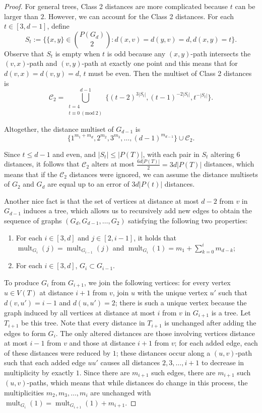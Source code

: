 \documentclass[12]{article}
\newcommand{\Mod}[1]{\ (\mathrm{mod}\ #1)}
\DeclareMathOperator{\mult}{mult}
\theoremstyle{definition}
\begin{document}
\begin{proof}
		  For general trees, Class 2 distances are more complicated because $t$ can be larger than $2$.  However, we can account for the Class 2 distances.  For each $t \in [3,d-1]$, define 
		  $$S_t := \{\{x,y\}\in {P(G_d) \choose 2}: d(x,v) = d(y,v) = d, d(x,y) = t\}.$$
		  Observe that $S_t$ is empty when $t$ is odd because any $(x,y)$-path intersects the $(v,x)$-path and $(v,y)$-path at exactly one point and this means that for $d(v,x) = d(v,y) = d$, $t$ must be even.  Then the multiset of Class 2 distances is 
		  $$\mathcal{C}_2 = \bigcup_{\substack{t = 4 \\ t \equiv 0 \Mod{2}}}^{d-1} \{(t-2)^{3|S_t|}, (t-1)^{-2|S_t|}, t^{-|S_t|}\}.$$
		
		Altogether, the distance multiset of $G_{d-1}$ is
		$$\{1^{m_1 + m_d}, 2^{m_2}, 3^{m_3}, \ldots, (d-1)^{m_{d-1}}\} \cup \mathcal{C}_2.$$
		
		Since $t \leq d-1$ and even, and $|S_t| \leq |P(T)|$, with each pair in $S_t$ altering $6$ distances, it follows that $\mathcal{C}_2$ alters at most $\frac{6d|P(T)|}{2} = 3d|P(T)|$ distances, which means that if the $\mathcal{C}_2$ distances were ignored, we can assume the distance multisets of $G_2$ and $G_d$ are equal up to an error of $3d|P(t)|$ distances.
		
		Another nice fact is that the set of vertices at distance at most $d-2$ from $v$ in $G_{d-1}$ induces a tree, which allows us to recursively add new edges to obtain the sequence of graphs $(G_d, G_{d-1}, \ldots, G_{2})$ satisfying the following two properties:
		\begin{enumerate}
			\item For each $i \in [3,d]$ and $j \in [2,i-1]$, it holds that $\mult_{G_i}(j) = \mult_{G_{i-1}}(j)$ and $\mult_{G_i}(1) = m_1 + \sum_{k=0}^{i} m_{d-k}$;
			\item For each $i \in [3,d]$, $G_{i} \subset G_{i-1}$.
		\end{enumerate}
		To produce $G_{i}$ from $G_{i+1}$, we join the following vertices:  for every vertex $u \in V(T)$ at distance $i+1$ from $v$, join $u$ with the unique vertex $u'$ such that $d(v,u') = i-1$ and $d(u,u') = 2$; there is such a unique vertex because the graph induced by all vertices at distance at most $i$ from $v$ in $G_{i+1}$ is a tree.  Let $T_{i+1}$ be this tree.  Note that every distance in $T_{i+1}$ is unchanged after adding the edges to form $G_i$.  The only altered distances are those involving vertices distance at most $i-1$ from $v$ and those at distance $i+1$ from $v$; for each added edge, each of these distances were reduced by $1$; these distances occur along a $(u,v)$-path such that each added edge $uu'$ causes all distances $2, 3, \ldots, i+1$ to decrease in multiplicity by exactly $1$.  Since there are $m_{i+1}$ such edges, there are $m_{i+1}$ such $(u,v)$-paths, which means that while distances do change in this process, the multiplicities $m_2, m_3, \ldots, m_i$ are unchanged with $\mult_{G_{i}}(1) = \mult_{G_{i+1}}(1) + m_{i+1}$. \qedhere
	\end{proof}
	\newpage
	
\end{document}

